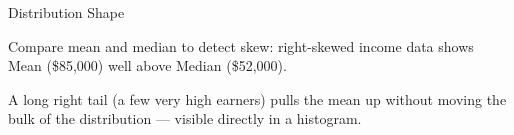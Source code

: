 \begin{frame}{Distribution Shape}
    \begin{sitemize}
        \item Compare mean and median to detect skew: right-skewed income data shows Mean (\$85{,}000) well above Median (\$52{,}000).
        \item A long right tail (a few very high earners) pulls the mean up without moving the bulk of the distribution — visible directly in a histogram.
    \end{sitemize}
    \begin{figure}
    \centering
    \end{figure}
\end{frame}


